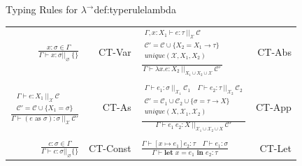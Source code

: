 \begin{definitiontitled}{Typing Rules for $\lambda^\rightarrow$}{def:typerulelambda}
\begin{tabularx}{\textwidth}{ r r X r}
\centering
$ \displaystyle \frac{ x:\sigma \in \Gamma
}{      \Gamma \vdash x:\sigma ||_{\varnothing} \: \{\}}
$ &
CT-Var
&
$ \displaystyle 
\frac{  \begin{array}{c}
          \Gamma,x:X_1 \vdash e : \tau \: ||_{\mathcal{X}} \: \mathcal{C}\\
          \mathcal{C}' = \mathcal{C} \cup \{ X_2 = X_1 \rightarrow \tau \}  \\
          unique(\mathcal{X},X_1,X_2) \\
        \end{array}
} { \Gamma \vdash \lambda x.e : X_2 \: ||_{X_1 \cup X_2 \cup \mathcal{X}} \: \mathcal{C}'}
$ 
& CT-Abs \\
\\

$ \displaystyle \frac{  \begin{array}{c} 
                          \Gamma \vdash e : X_1 \: ||_{\mathcal{X}} \: \mathcal{C} \\
                          \mathcal{C}' = \mathcal{C} \cup \{ X_1 = \sigma \}
                        \end{array}}
{ \Gamma \vdash (e \text{ as } \sigma) : \sigma \: ||_{\mathcal{X}} \: \mathcal{C}' }
$
& CT-As &
$ \displaystyle
\frac{  \begin{array}{c}
          \Gamma \vdash e_1 : \sigma \: ||_{\mathcal{X}_1} \: \mathcal{C}_1 
            \quad \Gamma \vdash e_2 : \tau \: ||_{\mathcal{X}_2} \: \mathcal{C}_2 \\
          \mathcal{C}' = \mathcal{C}_1 \cup \mathcal{C}_2 \cup \{\sigma = \tau \rightarrow X\} \\
          unique(X,\mathcal{X}_1,\mathcal{X}_2) \\
        \end{array}
} { \Gamma \vdash e_1 \: e_2 : X \: ||_{\mathcal{X}_1 \cup \mathcal{X}_2 \cup X} \: \mathcal{C}' }
$ & CT-App \\
\\

$ \displaystyle
  \frac
    { c : \sigma \in \Gamma }
    { \Gamma \vdash c : \sigma ||_{\varnothing} \{\}}
$
&
CT-Const
& 

$ \displaystyle
  \frac
  { \Gamma \vdash [ x \mapsto e_1] e_2 : \tau \quad \Gamma \vdash e_1 : \sigma }
  { \Gamma \vdash \textbf{let } x = e_1 \textbf{ in } e_2 : \tau} 
$
&
CT-Let
\\
\end{tabularx}

\end{definitiontitled}

